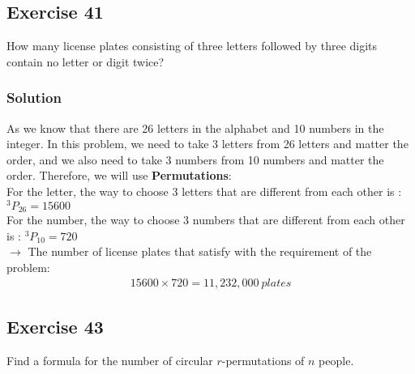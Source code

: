 \documentclass{article}
\theoremstyle{mytheoremstyle}
\theoremstyle{mytheoremstyle}
\theoremstyle{myproblemstyle}
\begin{document}
    \subsection*{Exercise 41}
    How many license plates consisting of three letters followed by three digits contain no letter or digit twice?
    \subsubsection*{Solution}
    As we know that there are 26 letters in the alphabet and 10 numbers in the integer.
    In this problem, we need to take 3 letters from 26 letters and matter the order, and we 
    also need to take 3 numbers from 10 numbers and matter the order. Therefore, we will use
    \textbf{Permutations}:\\
    
    For the letter, the way to choose 3 letters that are different from each other is : $ ^3P_{26} = 15600 $\\

    For the number, the way to choose 3 numbers that are different from each other is : $ ^3P_{10} = 720 $\\

    $ \rightarrow $ The number of license plates that satisfy with the requirement of the problem:
    \begin{align*}
        15600 \times 720 = 11,232,000 \ plates
    \end{align*}
    \subsection*{Exercise 43}
    Find a formula for the number of circular \(r\)-permutations of \(n\) people.
\end{document}
